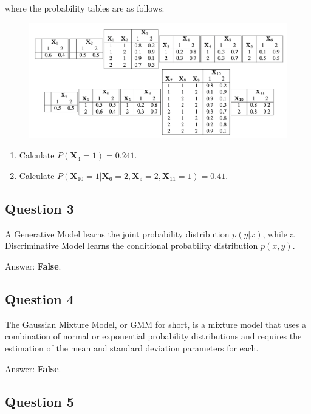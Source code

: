 \documentclass[11pt,fancychapters]{article}
\begin{document}
where the probability tables are as follows:

\begin{figure}[h!]
	\centering
	\includegraphics[scale=.13]{BN(b)11.png}
\end{figure}

\pagebreak

\begin{enumerate}[label=\textbf{\alph*.}]
	\item Calculate $P(\textbf{X}_4 = 1) = 0.241$.
	\item Calculate $P(\textbf{X}_{10} = 1 | \textbf{X}_6 = 2, \textbf{X}_9 = 2, \textbf{X}_{11} = 1) = 0.41$.
\end{enumerate}

\subsection*{Question 3 {\normalfont{[1 point]}}}

A Generative Model learns the joint probability distribution $p(y | x)$, while a Discriminative Model learns the conditional probability distribution $p(x, y)$.

Answer: \textbf{False}.

\subsection*{Question 4 {\normalfont{[1 point]}}}

The Gaussian Mixture Model, or GMM for short, is a mixture model that uses a combination of normal or exponential probability distributions and requires the estimation of the mean and standard deviation parameters for each.

Answer: \textbf{False}.

\subsection*{Question 5 {\normalfont{[1 point]}}}
\end{document}
